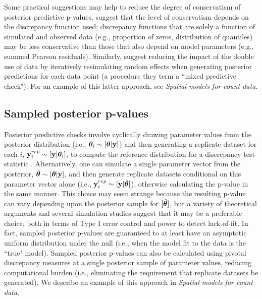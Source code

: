 \documentclass[12pt,english]{article}
\begin{document}
\begin{spacing}{1.9}
Some practical suggestions may help to reduce the degree of conservatism of posterior predictive p-values.  \citet{LunnEtAl2013} suggest that the level of conservatism depends on the discrepancy function used; discrepancy functions that are solely a function of simulated and observed data (e.g., proportion of zeros, distribution of quantiles) may be less conservative than those that also depend on model parameters (e.g., summed Pearson residuals).  Similarly, \citet{MarshallSpiegelhalter2003} suggest reducing the impact of the double use of data by iteratively resimulating random effects when generating posterior predictions for each data point (a procedure they term a ``mixed predictive check").  For an example of this latter approach, see \textit{Spatial models for count data}.

\subsection{Sampled posterior p-values}

Posterior predictive checks involve cyclically drawing parameter values from the posterior distribution (i.e., $\boldsymbol{\theta}_i \sim [\boldsymbol{\theta}| {\bf y}]$) and then generating a replicate dataset for each $i$, ${\bf y}_i^{rep} \sim [{\bf y} | \boldsymbol{\theta}_i]$, to compute the reference distribution for a discrepancy test statistic \citep[][; Appendix A, Alg. 2]{GelmanEtAl2004}.  Alternatively, one can simulate a single parameter vector from the posterior, $\tilde{\boldsymbol{\theta}} \sim [\boldsymbol{\theta}| {\bf y}]$, and then generate replicate datasets conditional on this parameter vector alone (i.e., ${\bf y}_i^{rep} \sim [{\bf y} | \tilde{\boldsymbol{\theta}}]$), otherwise calculating the p-value in the same manner.  This choice may seem strange because the resulting p-value can vary depending upon the posterior sample for $[\tilde{\boldsymbol{\theta}}]$, but a variety of theoretical arguments \citep[e.g.,][]{Johnson2004,Johnson2007,YuanJohnson2012,Gosselin2011} and several simulation studies \citep[e.g.,][]{Gosselin2011,Zhang2014} suggest that it may be a preferable choice, both in terms of Type I error control and power to detect lack-of-fit.  In fact, sampled posterior p-values are guaranteed to at least have an asymptotic uniform distribution under the null \citep{Gosselin2011} (i.e., when the model fit to the data is the ``true" model).  Sampled posterior p-values can also be calculated using pivotal discrepancy measures at a single posterior sample of parameter values, reducing computational burden (i.e., eliminating the requirement that replicate datasets be generated). We describe an example of this approach in \textit{Spatial models for count data}.


\end{spacing}
\end{document}
